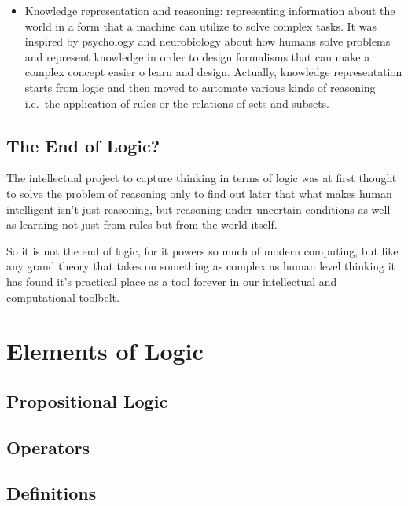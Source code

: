\documentclass[]{book}
\providecommand{\tightlist}{%
  \setlength{\itemsep}{0pt}\setlength{\parskip}{0pt}}
\theoremstyle{definition}
\theoremstyle{definition}
\theoremstyle{definition}
\theoremstyle{remark}
\begin{document}
\begin{itemize}
\tightlist
\item
  Knowledge representation and reasoning: representing information about
  the world in a form that a machine can utilize to solve complex tasks.
  It was inspired by psychology and neurobiology about how humans solve
  problems and represent knowledge in order to design formalisms that
  can make a complex concept easier o learn and design. Actually,
  knowledge representation starts from logic and then moved to automate
  various kinds of reasoning i.e.~the application of rules or the
  relations of sets and subsets.
\end{itemize}

\subsection{The End of Logic?}\label{the-end-of-logic}

The intellectual project to capture thinking in terms of logic was at
first thought to solve the problem of reasoning only to find out later
that what makes human intelligent isn't just reasoning, but reasoning
under uncertain conditions as well as learning not just from rules but
from the world itself.

So it is not the end of logic, for it powers so much of modern
computing, but like any grand theory that takes on something as complex
as human level thinking it has found it's practical place as a tool
forever in our intellectual and computational toolbelt.

\section{Elements of Logic}\label{elements-of-logic}

\subsection{Propositional Logic}\label{propositional-logic}

\subsection{Operators}\label{operators}

\subsection{Definitions}\label{definitions}
\end{document}
